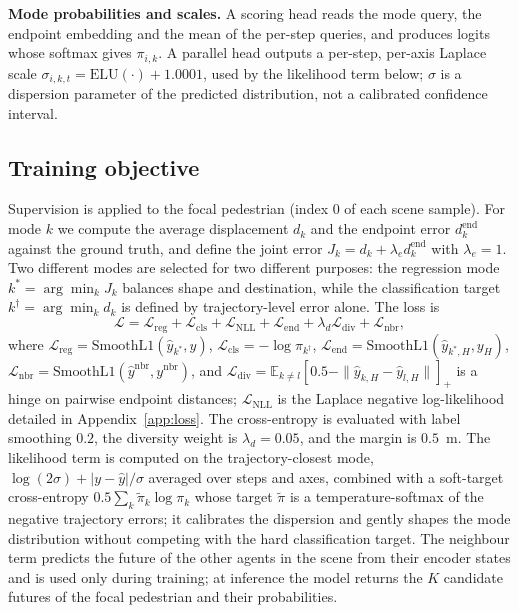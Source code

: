 \textbf{Mode probabilities and scales.} A scoring head reads the mode query, the endpoint embedding and the mean of the per-step queries, and produces logits whose softmax gives $\pi_{i,k}$. A parallel head outputs a per-step, per-axis Laplace scale $\sigma_{i,k,t}=\mathrm{ELU}(\cdot)+1.0001$, used by the likelihood term below; $\sigma$ is a dispersion parameter of the predicted distribution, not a calibrated confidence interval.

\subsection{Training objective}
\label{sec:loss}

Supervision is applied to the focal pedestrian (index 0 of each scene sample). For mode $k$ we compute the average displacement $d_{k}$ and the endpoint error $d^{\mathrm{end}}_{k}$ against the ground truth, and define the joint error $J_{k}=d_{k}+\lambda_{e}d^{\mathrm{end}}_{k}$ with $\lambda_{e}=1$. Two different modes are selected for two different purposes: the regression mode $k^{\ast}=\arg\min_{k}J_{k}$ balances shape and destination, while the classification target $k^{\dagger}=\arg\min_{k}d_{k}$ is defined by trajectory-level error alone. The loss is
\begin{equation}
\mathcal{L}=\mathcal{L}_{\mathrm{reg}}+\mathcal{L}_{\mathrm{cls}}
+\mathcal{L}_{\mathrm{NLL}}+\mathcal{L}_{\mathrm{end}}
+\lambda_{d}\mathcal{L}_{\mathrm{div}}+\mathcal{L}_{\mathrm{nbr}},
\label{eq:loss}
\end{equation}
where $\mathcal{L}_{\mathrm{reg}}=\mathrm{SmoothL1}(\hat{y}_{k^{\ast}},y)$, $\mathcal{L}_{\mathrm{cls}}=-\log\pi_{k^{\dagger}}$, $\mathcal{L}_{\mathrm{end}}=\mathrm{SmoothL1}(\hat{y}_{k^{\ast},H},y_{H})$, $\mathcal{L}_{\mathrm{nbr}}=\mathrm{SmoothL1}(\hat{y}^{\mathrm{nbr}},y^{\mathrm{nbr}})$, and $\mathcal{L}_{\mathrm{div}}=\mathbb{E}_{k\ne l}[0.5-\|\hat{y}_{k,H}-\hat{y}_{l,H}\|]_{+}$ is a hinge on pairwise endpoint distances; $\mathcal{L}_{\mathrm{NLL}}$ is the Laplace negative log-likelihood detailed in Appendix~\ref{app:loss}. The cross-entropy is evaluated with label smoothing $0.2$, the diversity weight is $\lambda_{d}=0.05$, and the margin is $0.5$~m. The likelihood term is computed on the trajectory-closest mode, $\log(2\sigma)+|y-\hat{y}|/\sigma$ averaged over steps and axes, combined with a soft-target cross-entropy $0.5\sum_{k}\tilde{\pi}_{k}\log\pi_{k}$ whose target $\tilde{\pi}$ is a temperature-softmax of the negative trajectory errors; it calibrates the dispersion and gently shapes the mode distribution without competing with the hard classification target. The neighbour term predicts the future of the other agents in the scene from their encoder states and is used only during training; at inference the model returns the $K$ candidate futures of the focal pedestrian and their probabilities.

